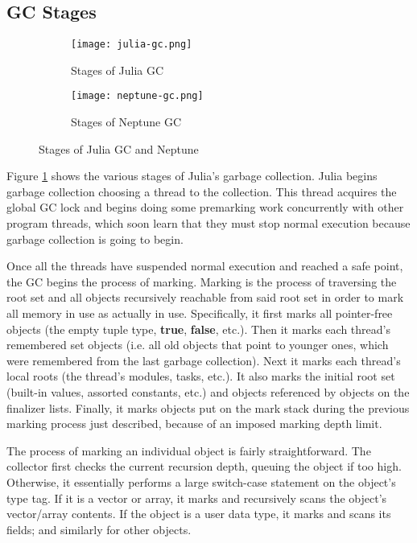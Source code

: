 \subsection{GC Stages}
\begin{figure}[h]
  \centering
  \begin{subfigure}{0.45\textwidth}
    \texttt{[image: julia-gc.png]}
    \caption{Stages of Julia GC}
    \label{fig:stages:jl}
  \end{subfigure}
  \begin{subfigure}{0.45\textwidth}
    \texttt{[image: neptune-gc.png]}
    \caption{Stages of Neptune GC}
    \label{fig:stages:np}
  \end{subfigure}
  \caption{Stages of Julia GC and Neptune}
  \label{fig:stages}
\end{figure}

Figure \ref{fig:stages:jl} shows the various stages of Julia's garbage collection.
Julia begins garbage collection choosing a thread to the collection.
This thread acquires the global GC lock and begins doing some premarking work concurrently with other program threads, which soon learn that they must stop normal execution because garbage collection is going to begin.

Once all the threads have suspended normal execution and reached a safe point, the GC begins the process of marking.
Marking is the process of traversing the root set and all objects recursively reachable from said root set in order to mark all memory in use as actually in use.
Specifically, it first marks all pointer-free objects (the empty tuple type, \textbf{true}, \textbf{false}, etc.).
Then it marks each thread's remembered set objects (i.e. all old objects that point to younger ones, which were remembered from the last garbage collection).
Next it marks each thread's local roots (the thread's modules, tasks, etc.).
It also marks the initial root set (built-in values, assorted constants, etc.) and objects referenced by objects on the finalizer lists.
Finally, it marks objects put on the mark stack during the previous marking process just described, because of an imposed marking depth limit.

The process of marking an individual object is fairly straightforward.
The collector first checks the current recursion depth, queuing the object if too high.
Otherwise, it essentially performs a large switch-case statement on the object's type tag.
If it is a vector or array, it marks and recursively scans the object's vector/array contents.
If the object is a user data type, it marks and scans its fields; and similarly for other objects.

